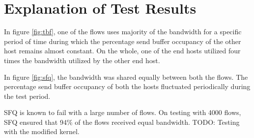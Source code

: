 \clearpage

\section{Explanation of Test Results}
In figure \ref{fig:tbf}, one of the flows uses majority of the bandwidth for a
specific period of time during which the percentage send buffer occupancy of
the other host remains almost constant. On the whole, one of the end hosts
utilized four times the bandwidth utilized by the other end host.

In figure \ref{fig:sfq}, the bandwidth was shared equally between both the
flows. The percentage send buffer occupancy of both the hosts fluctuated
periodically during the test period.

SFQ is known to fail with a large number of flows. On testing with 4000 flows,
SFQ ensured that 94\% of the flows received equal bandwidth.
TODO: Testing with the modified kernel.
